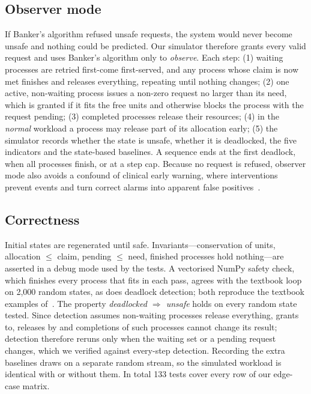 \documentclass[conference]{IEEEtran}
\begin{document}
\subsection{Observer mode}
If Banker's algorithm refused unsafe requests, the system would never become unsafe and nothing could be predicted. Our simulator therefore grants every valid request and uses Banker's algorithm only to \emph{observe}. Each step: (1) waiting processes are retried first-come first-served, and any process whose claim is now met finishes and releases everything, repeating until nothing changes; (2) one active, non-waiting process issues a non-zero request no larger than its need, which is granted if it fits the free units and otherwise blocks the process with the request pending; (3) completed processes release their resources; (4) in the \textit{normal} workload a process may release part of its allocation early; (5) the simulator records whether the state is unsafe, whether it is deadlocked, the five indicators and the state-based baselines. A sequence ends at the first deadlock, when all processes finish, or at a step cap. Because no request is refused, observer mode also avoids a confound of clinical early warning, where interventions prevent events and turn correct alarms into apparent false positives~\cite{Hyland2020}.

\subsection{Correctness}
Initial states are regenerated until safe. Invariants---conservation of units, allocation $\le$ claim, pending $\le$ need, finished processes hold nothing---are asserted in a debug mode used by the tests. A vectorised NumPy safety check, which finishes every process that fits in each pass, agrees with the textbook loop on 2,000 random states, as does deadlock detection; both reproduce the textbook examples of~\cite{Silberschatz2018}. The property \emph{deadlocked $\Rightarrow$ unsafe} holds on every random state tested. Since detection assumes non-waiting processes release everything, grants to, releases by and completions of such processes cannot change its result; detection therefore reruns only when the waiting set or a pending request changes, which we verified against every-step detection. Recording the extra baselines draws on a separate random stream, so the simulated workload is identical with or without them. In total 133 tests cover every row of our edge-case matrix.
\end{document}

